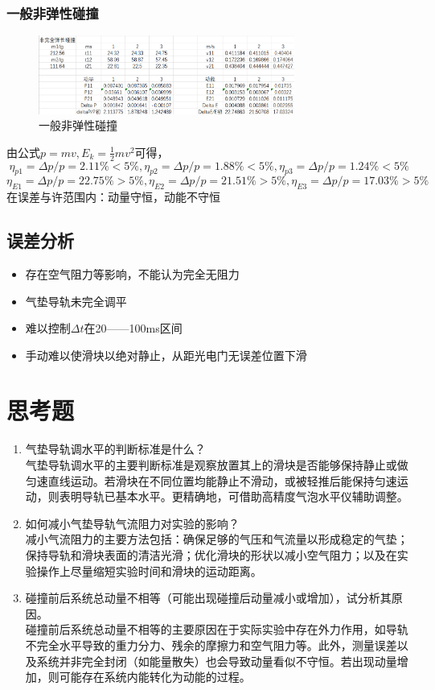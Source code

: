 \documentclass[12pt,a4paper]{article}
\begin{document}
			\subsubsection{一般非弹性碰撞}
				\begin{figure}[H]
					\centering
					\includegraphics[width=0.75\textwidth]{一般非弹性碰撞.png}
					\caption{一般非弹性碰撞}
					\label{fig:数据}
	  			\end{figure}
				由公式$p=mv,E_k=\frac{1}{2} m v^2$可得，
				$$\eta_{p1}=\Delta p/p=2.11\%<5\%,\eta_{p2}=\Delta p/p=1.88\%<5\%,\eta_{p3}=\Delta p/p=1.24\%<5\%$$
				$$\eta_{E1}=\Delta p/p=22.75\%>5\%,\eta_{E2}=\Delta p/p=21.51\%>5\%,\eta_{E3}=\Delta p/p=17.03\%>5\%$$
				在误差与许范围内：动量守恒，动能不守恒

		\subsection{误差分析}
				\begin{itemize}
					\item 存在空气阻力等影响，不能认为完全无阻力
					\item 气垫导轨未完全调平
					\item 难以控制$\Delta t$在20——100ms区间
					\item 手动难以使滑块以绝对静止，从距光电门无误差位置下滑
				\end{itemize}
				
	\section{思考题}
		\begin{enumerate}
			\item 气垫导轨调水平的判断标准是什么？\\
			气垫导轨调水平的主要判断标准是观察放置其上的滑块是否能够保持静止或做匀速直线运动。若滑块在不同位置均能静止不滑动，或被轻推后能保持匀速运动，则表明导轨已基本水平。更精确地，可借助高精度气泡水平仪辅助调整。
		
			\item 如何减小气垫导轨气流阻力对实验的影响？\\
			减小气流阻力的主要方法包括：确保足够的气压和气流量以形成稳定的气垫；保持导轨和滑块表面的清洁光滑；优化滑块的形状以减小空气阻力；以及在实验操作上尽量缩短实验时间和滑块的运动距离。
		
			\item 碰撞前后系统总动量不相等（可能出现碰撞后动量减小或增加），试分析其原因。\\
			碰撞前后系统总动量不相等的主要原因在于实际实验中存在外力作用，如导轨不完全水平导致的重力分力、残余的摩擦力和空气阻力等。此外，测量误差以及系统并非完全封闭（如能量散失）也会导致动量看似不守恒。若出现动量增加，则可能存在系统内能转化为动能的过程。
		\end{enumerate}
\end{document}
